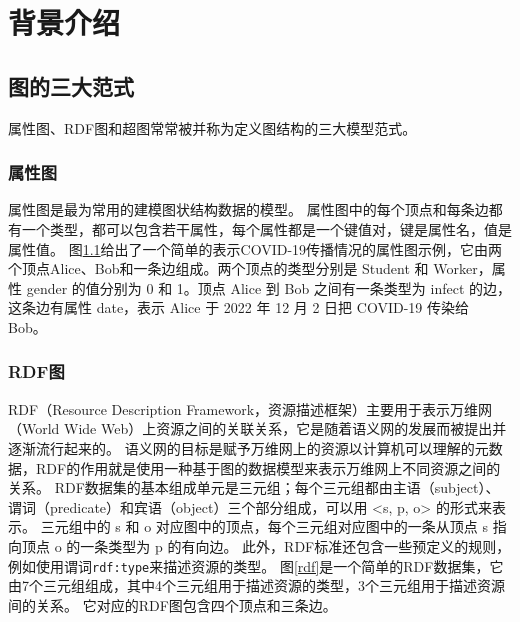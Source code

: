 \chapter{背景介绍}
\section{图的三大范式}
属性图、RDF图和超图常常被并称为定义图结构的三大模型范式。

\subsection{属性图}
属性图是最为常用的建模图状结构数据的模型。
属性图中的每个顶点和每条边都有一个类型，都可以包含若干属性，每个属性都是一个键值对，键是属性名，值是属性值。
图\ref{propertyG}给出了一个简单的表示COVID-19传播情况的属性图示例，它由两个顶点Alice、Bob和一条边组成。两个顶点的类型分别是 Student 和 Worker，属性 gender 的值分别为 0 和 1。顶点 Alice 到 Bob 之间有一条类型为 infect 的边，这条边有属性 date，表示 Alice 于 2022 年 12 月 2 日把 COVID-19 传染给 Bob。

\begin{figure}[htb] 
\label{propertyG}
\end{figure}

\subsection{RDF图}
RDF（Resource Description Framework，资源描述框架）主要用于表示万维网（World Wide Web）上资源之间的关联关系，它是随着语义网的发展而被提出并逐渐流行起来的。
语义网的目标是赋予万维网上的资源以计算机可以理解的元数据，RDF的作用就是使用一种基于图的数据模型来表示万维网上不同资源之间的关系。
RDF数据集的基本组成单元是三元组；每个三元组都由主语（subject）、谓词（predicate）和宾语（object）三个部分组成，可以用 <s, p, o> 的形式来表示。
三元组中的 s 和 o 对应图中的顶点，每个三元组对应图中的一条从顶点 s 指向顶点 o 的一条类型为 p 的有向边。
此外，RDF标准还包含一些预定义的规则，例如使用谓词\texttt{rdf:type}来描述资源的类型。
图\ref{rdf}是一个简单的RDF数据集，它由7个三元组组成，其中4个三元组用于描述资源的类型，3个三元组用于描述资源间的关系。
它对应的RDF图包含四个顶点和三条边。

